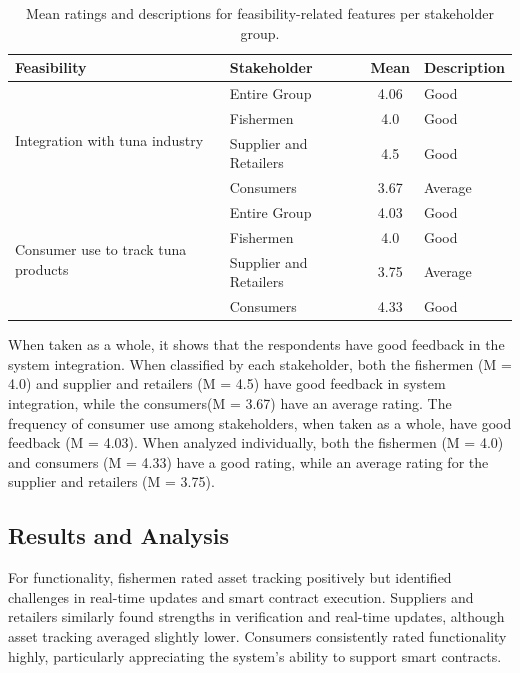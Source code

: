 	
	\vspace{1cm}
	\begin{table}[h]
		\centering
		\begin{tabular}{|l|l|c|l|}
			\hline
			\textbf{Feasibility} & \textbf{Stakeholder} & \textbf{Mean} & \textbf{Description} \\ \hline
			\multirow{4}{*}{Integration with tuna industry} 
			& Entire Group & 4.06 & Good \\ \cline{2-4}
			& Fishermen & 4.0 & Good \\ \cline{2-4}
			& Supplier and Retailers & 4.5 & Good \\ \cline{2-4}
			& Consumers & 3.67 & Average \\ \hline
			
			\multirow{4}{*}{Consumer use to track tuna products} 
			& Entire Group & 4.03 & Good \\ \cline{2-4}
			& Fishermen & 4.0 & Good \\ \cline{2-4}
			& Supplier and Retailers & 3.75 & Average \\ \cline{2-4}
			& Consumers & 4.33 & Good \\ \hline
			
		\end{tabular}
		\caption{Mean ratings and descriptions for feasibility-related features per stakeholder group.}
		\label{tab:feasibility}
	\end{table}
	
	When taken as a whole, it shows that the respondents have good feedback in the system integration. When classified by each stakeholder, both the fishermen (M = 4.0) and supplier and retailers (M = 4.5) have good feedback in system integration, while the consumers(M = 3.67) have an average rating. The frequency of consumer use among stakeholders, when taken as a whole, have good feedback (M = 4.03). When analyzed individually, both the fishermen (M = 4.0) and consumers (M = 4.33) have a good rating, while an average rating for the supplier and retailers (M = 3.75).
	 
\subsection{Results and Analysis}	
For functionality, fishermen rated asset tracking positively but identified challenges in real-time updates and smart contract execution. Suppliers and retailers similarly found strengths in verification and real-time updates, although asset tracking averaged slightly lower. Consumers consistently rated functionality highly, particularly appreciating the system's ability to support smart contracts.

